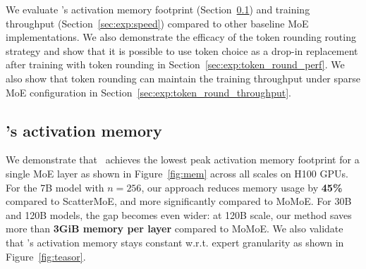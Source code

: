 
We evaluate \Algname's activation memory footprint (Section~\ref{sec:exp:mem}) and training throughput (Section~\ref{sec:exp:speed}) compared to other baseline MoE implementations. We also demonstrate the efficacy of the token rounding routing strategy and show that it is possible to use token choice as a drop-in replacement after training with token rounding in Section~\ref{sec:exp:token_round_perf}. We also show that token rounding can maintain the training throughput under sparse MoE configuration in Section~\ref{sec:exp:token_round_throughput}.

\subsection{\Algname's activation memory} \label{sec:exp:mem}
We demonstrate that \Algname\ achieves the lowest peak activation memory footprint for a single MoE layer as shown in Figure~\ref{fig:mem} across all scales on H100 GPUs. For the 7B model with $n=256$, our approach reduces memory usage by \textbf{45\%} compared to ScatterMoE, and more significantly compared to MoMoE. For 30B and 120B models, the gap becomes even wider: at 120B scale, our method saves more than \textbf{3GiB memory per layer} compared to MoMoE. We also validate that \Algname's activation memory stays constant w.r.t. expert granularity as shown in Figure~\ref{fig:teasor}.






